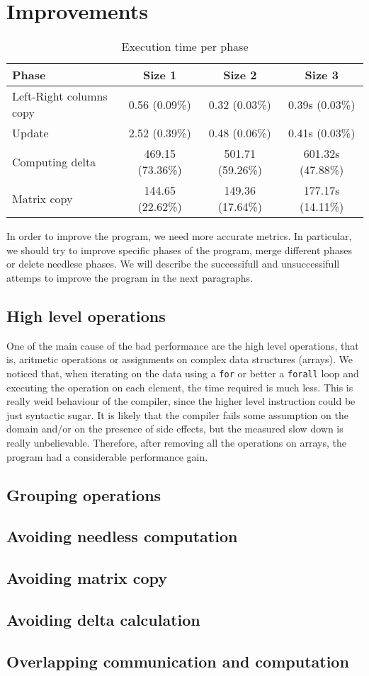 \documentclass{article}
\begin{document}
\section{Improvements} \label{sec:improvements}

\begin{table}
\centering
\begin{tabular}{|l|c|c|c|}
\hline
Phase & Size 1 & Size 2 & Size 3 \\
\hline
Left-Right columns copy & 0.56 (0.09\%) & 0.32 (0.03\%) & 0.39s (0.03\%) \\
\hline
Update & 2.52 (0.39\%) & 0.48 (0.06\%) & 0.41s (0.03\%) \\
\hline
Computing delta & 469.15 (73.36\%) & 501.71 (59.26\%) & 601.32s (47.88\%) \\
\hline
Matrix copy & 144.65 (22.62\%) & 149.36 (17.64\%) & 177.17s (14.11\%) \\
\hline
\end{tabular}
\caption{Execution time per phase} \label{tab:timeperphasecomparison}
\end{table}

In order to improve the program, we need more accurate metrics. In particular, we should try to improve specific phases of the program, merge different phases or delete needlese phases. We will describe the successifull and unsuccessifull attemps to improve the program in the next paragraphs.

\subsection{High level operations}
One of the main cause of the bad performance are the high level operations, that is, aritmetic operations or assignments on complex data structures (arrays). We noticed that, when iterating on the data using a \texttt{for} or better a \texttt{forall} loop and executing the operation on each element, the time required is much less. This is really weid behaviour of the compiler, since the higher level instruction could be just syntactic sugar. It is likely that the compiler fails some assumption on the domain and/or on the presence of side effects, but the measured slow down is really unbelievable. Therefore, after removing all the operations on arrays, the program had a considerable performance gain.

\subsection{Grouping operations}


\subsection{Avoiding needless computation}

\subsection{Avoiding matrix copy}

\subsection{Avoiding delta calculation}

\subsection{Overlapping communication and computation}
\end{document}
